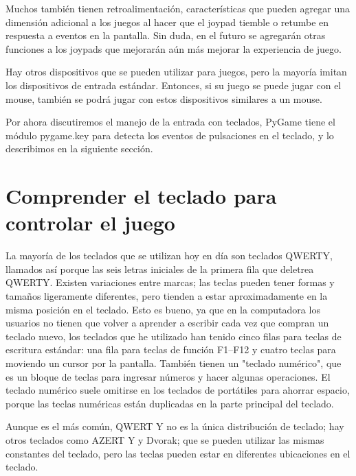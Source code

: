 {Muchos también tienen retroalimentación, características que pueden agregar una dimensión adicional a 
los juegos al hacer que el joypad tiemble o retumbe en respuesta a eventos en la pantalla. Sin duda, en el futuro se 
agregarán otras funciones a los joypads que mejorarán aún más mejorar la experiencia de juego.


Hay otros dispositivos que se pueden utilizar para juegos, pero la mayoría imitan los dispositivos de entrada estándar.
Entonces, si su juego se puede jugar con el mouse, también se podrá jugar con estos dispositivos similares a un mouse. 


Por ahora discutiremos el manejo de la entrada con teclados, PyGame tiene el módulo {\ttfamily pygame.key} para detecta los eventos de pulsaciones  en el teclado, y lo describimos en la siguiente sección.



\section{Comprender el teclado para controlar el juego}

La mayoría de los teclados que se utilizan hoy en día son teclados QWERTY, llamados así porque las seis letras iniciales 
de la primera fila que deletrea QWERTY. Existen variaciones entre marcas; las teclas pueden tener formas y tamaños ligeramente
diferentes, pero tienden a estar aproximadamente en la misma posición en el teclado. Esto es bueno, ya que en la computadora
los usuarios no tienen que volver a aprender a escribir cada vez que compran un teclado nuevo,  los teclados que he
utilizado han tenido cinco filas para teclas de escritura estándar: una fila para teclas de función F1–F12 y cuatro teclas 
para moviendo un cursor por la pantalla. También tienen un "teclado numérico", que es un bloque de teclas para ingresar números
y hacer algunas operaciones.  El teclado numérico suele omitirse en los teclados de portátiles para ahorrar espacio, porque las teclas numéricas están  duplicadas en la parte principal del teclado. 

Aunque es el más común, QWERT Y no es la única distribución de teclado; hay otros teclados
como AZERT Y y Dvorak; que se pueden utilizar las mismas constantes del teclado, pero las teclas pueden estar en diferentes
ubicaciones en el teclado.\\

}
